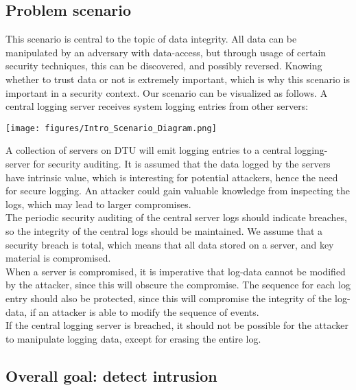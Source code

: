 
\subsection{Problem scenario}

This scenario is central to the topic of data integrity. All data can be manipulated by an adversary with data-access, but through usage of certain security techniques, this can be discovered, and possibly reversed. Knowing whether to trust data or not is extremely important, which is why this scenario is important in a security context.
Our scenario can be visualized as follows. A central logging server receives system logging entries from other servers:
\\

\begin{center}
    \texttt{[image: figures/Intro\_Scenario\_Diagram.png]}
\end{center}

A collection of servers on DTU will emit logging entries to a central logging-server for security auditing. It is assumed that the data logged by the servers have intrinsic value, which is interesting for potential attackers, hence the need for secure logging. An attacker could gain valuable knowledge from inspecting the logs, which may lead to larger compromises. 
\\The periodic security auditing of the central server logs should indicate breaches, so the integrity of the central logs should be maintained.
We assume that a security breach is total, which means that all data stored on a server, and key material is compromised.
\\When a server is compromised, it is imperative that log-data cannot be modified by the attacker, since this will obscure the compromise.
The sequence for each log entry should also be protected, since this will compromise the integrity of the log-data, if an attacker is able to modify the sequence of events.
\\If the central logging server is breached, it should not be possible for the attacker to manipulate logging data, except for erasing the entire log.

\subsection{Overall goal: detect intrusion}

